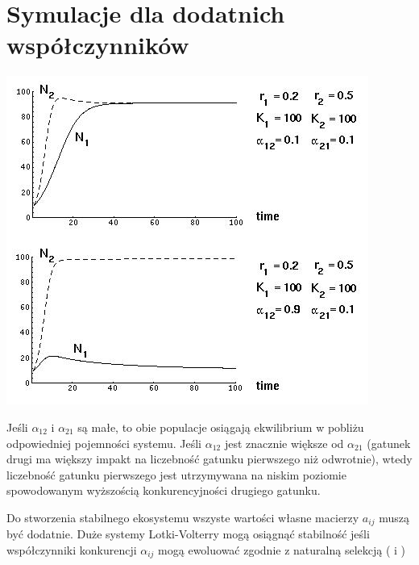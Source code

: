 \section{Symulacje dla dodatnich współczynników}

\includegraphics{img/Fig2}

\noindent Jeśli $\alpha_{12}$ i $\alpha_{21}$ są małe, to obie populacje osiągają ekwilibrium w pobliżu odpowiedniej pojemności systemu. Jeśli $\alpha_{12}$ jest znacznie większe od $\alpha_{21}$ (gatunek drugi ma większy impakt na liczebność gatunku pierwszego niż odwrotnie), wtedy liczebność gatunku pierwszego jest utrzymywana na niskim poziomie spowodowanym wyższością konkurencyjności drugiego gatunku.

\noindent Do stworzenia stabilnego ekosystemu wszyste wartości własne macierzy $a_{ij}$ muszą być dodatnie. Duże systemy Lotki-Volterry mogą osiągnąć stabilność jeśli współczynniki konkurencji $\alpha_{ij}$ mogą ewoluować zgodnie z naturalną selekcją (\cite{Kon} i \cite{Ack})